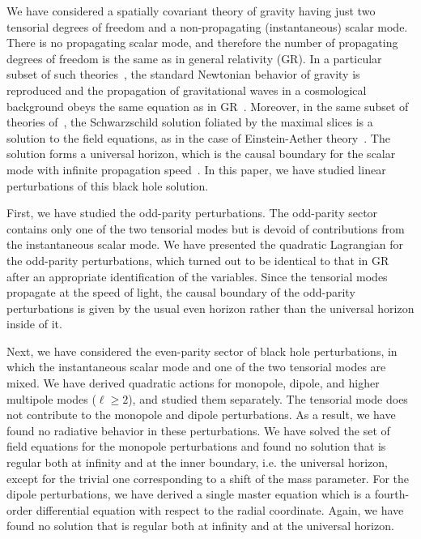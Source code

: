 \documentclass[aps,prd,preprintnumbers,superscriptaddress,nofootinbib,notitlepage]{revtex4-2}
\begin{document}
We have considered a spatially covariant theory of gravity
having just two tensorial degrees of freedom and a non-propagating (instantaneous) scalar mode.
There is no propagating scalar mode, and therefore
the number of propagating degrees of freedom is the same as in general relativity (GR).
In a particular subset of such theories~\cite{Gao:2019twq},
the standard Newtonian behavior of gravity is reproduced
and the propagation of gravitational waves in a cosmological background obeys the same equation
as in GR~\cite{Iyonaga:2021yfv}.
Moreover, in the same subset of theories of~\cite{Gao:2019twq},
the Schwarzschild solution foliated by the maximal slices is
a solution to the field equations, as in the case of
Einstein-Aether theory~\cite{Berglund:2012bu}.
The solution forms a universal horizon,
which is the causal boundary for the scalar mode with infinite propagation speed~\cite{Iyonaga:2021yfv}.
In this paper, we have studied linear perturbations of this black hole solution.








First, we have studied the odd-parity perturbations.
The odd-parity sector contains only one of the two tensorial modes but is devoid of contributions from the instantaneous scalar mode.
We have presented the quadratic Lagrangian for the odd-parity perturbations,
which turned out to be identical to that in GR after an appropriate identification of the variables. Since the tensorial modes propagate at the speed of light, the causal boundary of the odd-parity perturbations is given by the usual even horizon rather than the universal horizon inside of it.



Next, we have considered the even-parity sector of black hole perturbations, in which the instantaneous scalar mode and one of the two tensorial modes are mixed.
We have derived quadratic actions for monopole, dipole, and higher multipole modes ($\ell\ge 2$), and studied them separately.
The tensorial mode does not contribute to the monopole and dipole perturbations.
As a result, we have found no radiative behavior in these perturbations.
We have solved the set of field equations for the monopole perturbations and found no solution that is regular both at infinity and at the inner boundary, i.e. the universal horizon, except for the trivial one corresponding to a shift of the mass parameter.
For the dipole perturbations, we have derived a single master equation which is a fourth-order differential equation with respect to the radial coordinate. Again, we have found no solution that is regular both at infinity and at the universal horizon.
\end{document}
